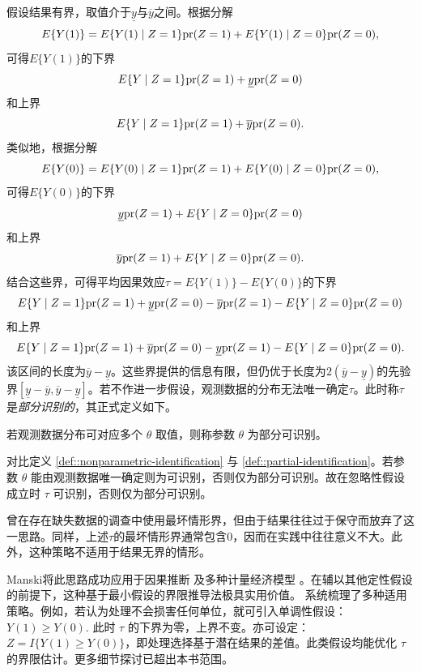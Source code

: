 假设结果有界，取值介于$\underline{y}$与$\overline{y}$之间。根据分解
$$
E\{  Y(1) \} = E\{  Y(1) \mid Z=1\} \textup{pr}(Z=1)  +  E\{  Y(1) \mid Z=0\} \textup{pr}(Z=0)  ,
$$
可得$E\{  Y(1) \}$的下界
$$
E\{  Y \mid Z=1\} \textup{pr}(Z=1)  +   \underline{y} \textup{pr}(Z=0) 
$$
和上界
$$
E\{  Y \mid Z=1\} \textup{pr}(Z=1)  +  \overline{y} \textup{pr}(Z=0).
$$
类似地，根据分解
$$
E\{  Y(0) \} = E\{  Y(0) \mid Z=1\} \textup{pr}(Z=1)  +  E\{  Y(0) \mid Z=0\} \textup{pr}(Z=0)  ,
$$
可得$E\{  Y(0) \}$的下界
$$
\underline{y}\textup{pr}(Z=1)  +  E\{  Y \mid Z=0\} \textup{pr}(Z=0) 
$$
和上界
$$
 \overline{y} \textup{pr}(Z=1)  +  E\{  Y \mid Z=0\} \textup{pr}(Z=0). 
$$
结合这些界，可得平均因果效应$\tau = E\{  Y(1) \} - E\{  Y(0) \}$的下界
$$
E\{  Y \mid Z=1\} \textup{pr}(Z=1)  +   \underline{y} \textup{pr}(Z=0) - \overline{y} \textup{pr}(Z=1)  -  E\{  Y \mid Z=0\} \textup{pr}(Z=0) 
$$
和上界
$$
 E\{  Y \mid Z=1\} \textup{pr}(Z=1)  +  \overline{y} \textup{pr}(Z=0) - \underline{y}\textup{pr}(Z=1)  -   E\{  Y \mid Z=0\} \textup{pr}(Z=0). 
$$
该区间的长度为$\overline{y}-\underline{y}$。这些界提供的信息有限，但仍优于长度为$2(\overline{y}-\underline{y})$的先验界$[\underline{y}-\overline{y}, \overline{y}-\underline{y}]$。若不作进一步假设，观测数据的分布无法唯一确定$\tau$。此时称$\tau$是{\it 部分识别的}，其正式定义如下。 


\begin{definition}
[部分可识别]\label{def::partial-identification}
若观测数据分布可对应多个 $\theta$ 取值，则称参数 $\theta$ 为部分可识别。 
\end{definition}


对比定义 \ref{def::nonparametric-identification} 与 \ref{def::partial-identification}。若参数 $\theta$ 能由观测数据唯一确定则为可识别，否则仅为部分可识别。故在忽略性假设成立时 $\tau$ 可识别，否则仅为部分可识别。 




\citet{cochran1953}曾在存在缺失数据的调查中使用最坏情形界，但由于结果往往过于保守而放弃了这一思路。同样，上述$\tau$的最坏情形界通常包含$0$，因而在实践中往往意义不大。此外，这种策略不适用于结果无界的情形。 



Manski将此思路成功应用于因果推断 \citep{manski1990nonparametric} 及多种计量经济模型 \citep{manski2003partial}。在辅以其他定性假设的前提下，这种基于最小假设的界限推导法极具实用价值。\citet{manski2003partial} 系统梳理了多种适用策略。例如，若认为处理不会损害任何单位，就可引入单调性假设：
$
Y(1)\geq Y(0) . 
$
此时 $\tau$ 的下界为零，上界不变。亦可设定：
$Z = I\{  Y(1) \geq Y(0) \}$，即处理选择基于潜在结果的差值。此类假设均能优化 $\tau$ 的界限估计。更多细节探讨已超出本书范围。

 
 


